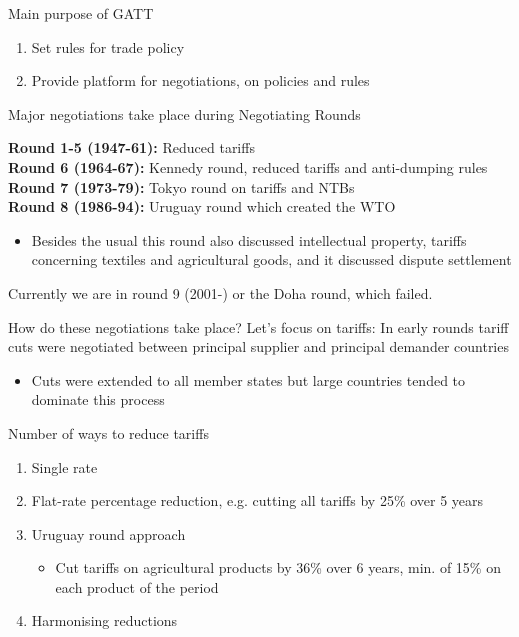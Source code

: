 \documentclass{beamer}
\begin{document}
\begin{frame}
  Main purpose of GATT
  \begin{enumerate}
    \item Set rules for trade policy
    \item Provide platform for negotiations, on policies and rules
  \end{enumerate}
  \medskip
  Major negotiations take place during Negotiating Rounds
\end{frame}

\begin{frame}
  \textbf{Round 1-5 (1947-61):} Reduced tariffs\\
  \textbf{Round 6 (1964-67):} Kennedy round, reduced tariffs and anti-dumping rules\\  
  \textbf{Round 7 (1973-79):} Tokyo round on tariffs and NTBs\\
  \medskip
  \textbf{Round 8 (1986-94):} Uruguay round which created the WTO
  \begin{itemize}
    \item Besides the usual this round also discussed intellectual property, tariffs concerning textiles and agricultural goods, and it discussed dispute settlement
  \end{itemize}
  \medskip
  Currently we are in round 9 (2001-) or the Doha round, which failed. 
\end{frame}

\begin{frame}
 How do these negotiations take place?
 Let's focus on tariffs: In early rounds tariff cuts were negotiated between principal supplier and principal demander countries
 \begin{itemize}
   \item Cuts were extended to all member states but large countries tended to dominate this process
 \end{itemize} 
\end{frame}

\begin{frame}
Number of ways to reduce tariffs
 \begin{enumerate}
   \item Single rate
   \item Flat-rate percentage reduction, e.g. cutting all tariffs by 25\% over 5 years
   \item Uruguay round approach
   \begin{itemize}
     \item Cut tariffs on agricultural products by 36\%  over 6 years, min. of 15\% on each product of the period
   \end{itemize}
  \item Harmonising reductions  
 \end{enumerate}  
\end{frame}
\end{document}
